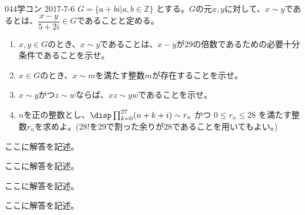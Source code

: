 \begin{prob}{044}{}{学コン 2017-7-6}
 $G=\{a+bi | a, b \in\mathbb{Z}\}$ とする。$G$の元$x,y$に対して、$x\sim y$であるとは、$\dfrac{x-y}{5+2i}\in G$であることと定める。
 \begin{enumerate}
  \item $x, y\in G$のとき、$x\sim y$であることは、$x-y$が29の倍数であるための必要十分条件であることを示せ。
  \item $x\in G$のとき、$x\sim m$を満たす整数$m$が存在することを示せ。
  \item $x\sim y$かつ$z\sim w$ならば、$xz\sim yw$であることを示せ。
  \item $n$を正の整数とし、$\disp \prod_{k=0}^{27} (n+k+i) \sim r_n$ かつ $0\le r_n \le 28$ を満たす整数$r_n$を求めよ。($28!$を29で割った余りが28であることを用いてもよい。)
 \end{enumerate}
\end{prob}
ここに解答を記述。

ここに解答を記述。

ここに解答を記述。

ここに解答を記述。